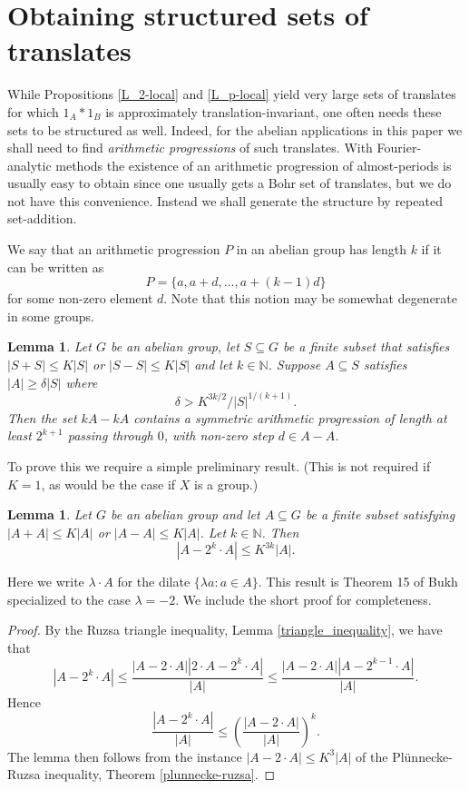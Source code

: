 \documentclass[12pt,a4paper,reqno]{amsart}
\numberwithin{equation}{section}
\theoremstyle{plain}
\newtheorem{lemma}[theorem]{Lemma}
\theoremstyle{definition}
\renewcommand{\leq}{\leqslant}
\renewcommand{\geq}{\geqslant}
\renewcommand{\subset}{\subseteq}
\def\N{\mathbb{N}}
\begin{document}
\section{Obtaining structured sets of translates}\label{structure-generation}
While Propositions \ref{L_2-local} and \ref{L_p-local} yield very large sets of translates for which $1_A*1_B$ is approximately translation-invariant, one often needs these sets to be structured as well. Indeed, for the abelian applications in this paper we shall need to find \emph{arithmetic progressions} of such translates. With Fourier-analytic methods the existence of an arithmetic progression of almost-periods is usually easy to obtain since one usually gets a Bohr set of translates, but we do not have this convenience. Instead we shall generate the structure by repeated set-addition.

We say that an arithmetic progression $P$ in an abelian group has length $k$ if it can be written as 
\[ P = \{ a, a+d, \ldots, a+(k-1)d \} \]
for some non-zero element $d$. Note that this notion may be somewhat degenerate in some groups.

\begin{lemma}\label{local-sarkozy}
Let $G$ be an abelian group, let $S \subset G$ be a finite subset that satisfies $|S+S| \leq K|S|$ or $|S-S| \leq K|S|$ and let $k \in \N$. Suppose $A \subset S$ satisfies $|A| \geq \delta |S|$ where
\[ \delta > K^{3k/2}/|S|^{1/(k+1)}. \]
Then the set $kA - kA$ contains a symmetric arithmetic progression of length at least $2^{k+1}$ passing through $0$, with non-zero step $d \in A-A$.
\end{lemma}

To prove this we require a simple preliminary result. (This is not required if $K = 1$, as would be the case if $X$ is a group.)

\begin{lemma}\label{dilate-lemma}
Let $G$ be an abelian group and let $A \subset G$ be a finite subset satisfying $|A+A| \leq K|A|$ or $|A-A| \leq K|A|$. Let $k \in \N$. Then
\[ |A - 2^k \cdot A| \leq K^{3k}|A|. \]
\end{lemma}

Here we write $\lambda \cdot A$ for the dilate $\{ \lambda a : a \in A \}$. This result is Theorem 15 of Bukh \cite{bukh:dilates} specialized to the case $\lambda = -2$. We include the short proof for completeness.
\begin{proof}
By the Ruzsa triangle inequality, Lemma \ref{triangle_inequality}, we have that
\[ |A - 2^k \cdot A| \leq \frac{|A - 2 \cdot A| |2 \cdot A - 2^k \cdot A|}{|A|} \leq \frac{|A - 2 \cdot A| |A - 2^{k-1} \cdot A|}{|A|}. \]
Hence
\[ \frac{|A - 2^k \cdot A|}{|A|} \leq \left( \frac{|A - 2\cdot A|}{|A|} \right)^k. \]
The lemma then follows from the instance $|A-2\cdot A| \leq K^3|A|$ of the Pl\"unnecke-Ruzsa inequality, Theorem \ref{plunnecke-ruzsa}.
\end{proof}
\end{document}
